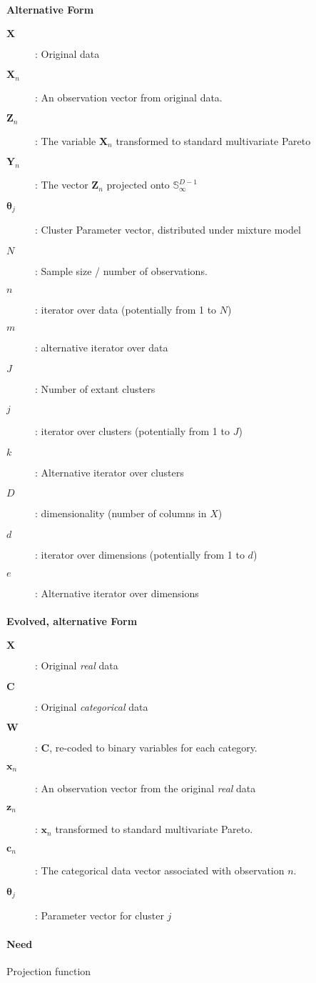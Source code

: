 \documentclass{article}
\begin{document}
\paragraph{Alternative Form}
\begin{description}
\item[$\bm{X}$]: Original data
\item[$\bm{X}_n$]: An observation vector from original data.
\item[$\bm{Z}_n$]: The variable $\bm{X}_n$ transformed to standard multivariate Pareto
\item[$\bm{Y}_n$]: The vector $\bm{Z}_n$ projected onto ${\mathbb S}_{\infty}^{D-1}$
\item[$\bm{\theta}_j$]: Cluster Parameter vector, distributed under mixture model
\item[$N$]: Sample size / number of observations.
\item[$n$]: iterator over data (potentially from 1 to $N$)
\item[$m$]: alternative iterator over data
\item[$J$]: Number of extant clusters
\item[$j$]: iterator over clusters (potentially from 1 to $J$)
\item[$k$]: Alternative iterator over clusters
\item[$D$]: dimensionality (number of columns in $X$)
\item[$d$]: iterator over dimensions (potentially from 1 to $d$)
\item[$e$]: Alternative iterator over dimensions
\end{description}

\paragraph{Evolved, alternative Form}
\begin{description}
\item[$\bm{X}$]: Original \emph{real} data
\item[$\bm{C}$]: Original \emph{categorical} data
\item[$\bm{W}$]: $\bm{C}$, re-coded to binary variables for each category.
\item[$\bm{x}_n$]: An observation vector from the original \emph{real} data
\item[$\bm{z}_n$]: $\bm{x}_n$ transformed to standard multivariate Pareto.
\item[$\bm{c}_n$]: The categorical data vector associated with observation $n$.
\item[$\bm{\theta}_j$]: Parameter vector for cluster $j$
\end{description}

\paragraph{Need}

Projection function
\end{document}
